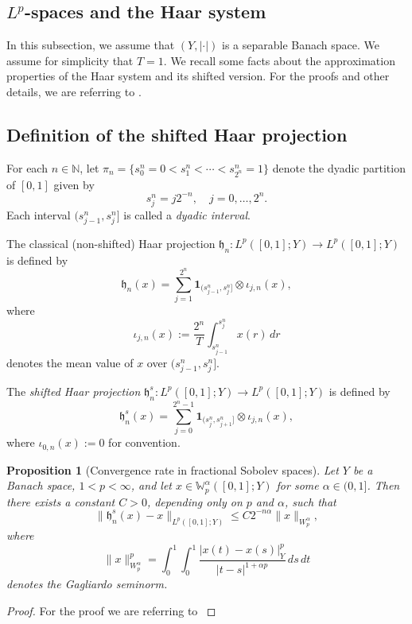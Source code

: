 \documentclass[english,a4paper,11pt]{amsart}
\theoremstyle{plain}
\newtheorem{proposition}[theorem]{Proposition}
\theoremstyle{definition}
\theoremstyle{remark}
\numberwithin{equation}{section}
\begin{document}
\begin{appendix}
\section{$L^p$-spaces and the Haar system}\label{app:haar-system}\setcounter{equation}{0} 

In this subsection, we assume that $(Y,|\cdot|)$ is a separable Banach space. We assume for simplicity that $T=1$.
We recall some facts about the approximation properties of the Haar system and its shifted version. For the proofs and other details, we are referring to \cite[Appendix B]{FKEHMH}.

\subsection{Definition of the shifted Haar projection}

For each $n \in \mathbb{N}$, let $\pi_n = \{ s^n_0 = 0 < s^n_1 < \cdots < s^n_{2^n} = 1\}$ denote the dyadic partition of $[0,1]$ given by
\[
s^n_j = j 2^{-n}, \quad j = 0, \dots, 2^n.
\]
Each interval $(s^n_{j-1}, s^n_j]$ is called a \textit{dyadic interval}.

The classical (non-shifted) Haar projection $\mathfrak{h}_n: L^p([0,1];Y) \to L^p([0,1];Y)$ is defined by
\[
\mathfrak{h}_n(x) = \sum_{j=1}^{2^n} \mathbf{1}_{(s^n_{j-1}, s^n_j]} \otimes \iota_{j,n}(x),
\]
where
\[
\iota_{j,n}(x) := \frac{2^n}{T} \int_{s^n_{j-1}}^{s^n_j} x(r) \, dr
\]
denotes the mean value of \(x\) over $(s^n_{j-1}, s^n_j]$.

The \textit{shifted Haar projection} $\mathfrak{h}_n^s : L^p([0,1];Y) \to L^p([0,1];Y)$ is defined by
\[
\mathfrak{h}_n^s(x) = \sum_{j=0}^{2^n-1} \mathbf{1}_{(s^n_j, s^n_{j+1}]} \otimes \iota_{j,n}(x),
\]
where $\iota_{0,n}(x) := 0$ for convention.



\begin{proposition}[Convergence rate in fractional Sobolev spaces]\label{prop:haar-conv}
Let $Y$ be a Banach space, $1 < p < \infty$, and let $x \in \mathbb{W}^{\alpha}_p([0,1];Y)$ for some $\alpha \in (0,1]$. Then there exists a constant $C>0$, depending only on $p$ and $\alpha$, such that
\[
\| \mathfrak{h}_n^s(x) - x \|_{L^p([0,1];Y)} \leq C 2^{-n\alpha} \|x\|_{{W}^{\alpha}_p},
\]
where
\[
\|x\|_{{W}^{\alpha}_p}^p = \int_0^1 \int_0^1 \frac{ | x(t) - x(s) |_Y^p }{ |t-s|^{1+\alpha p} } \, ds \, dt
\]
denotes the Gagliardo seminorm.
\end{proposition}

\begin{proof}
	For the proof we are referring to \cite[Lemma B.2]{FKEHMH}
\end{proof}



\end{appendix}
\end{document}
